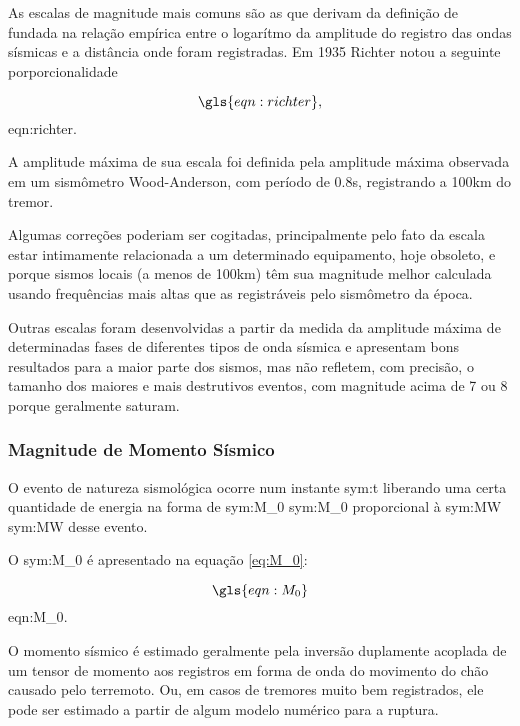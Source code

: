 As escalas de magnitude mais comuns são as que derivam da definição de \citet{richter_1935}
fundada na relação empírica entre o logarítmo da amplitude do registro das ondas sísmicas e a distância onde foram
registradas. Em 1935 Richter notou a seguinte porporcionalidade

\begin{equation}
	\gls{eqn:richter},
	\label{eq:richter}
\end{equation}
\glsdesc*{eqn:richter}.


A amplitude máxima de sua
escala foi definida pela amplitude máxima observada em um sismômetro Wood-Anderson, com período de 0.8s, registrando a 100km 
do tremor.

Algumas correções poderiam ser cogitadas, principalmente pelo fato da escala estar intimamente 
relacionada a um determinado equipamento, hoje obsoleto, e porque sismos locais (a menos de 100km) têm sua magnitude
melhor calculada usando frequências mais altas que as registráveis pelo sismômetro da época.


Outras escalas foram desenvolvidas a partir da medida da amplitude máxima de determinadas fases 
de diferentes tipos de onda sísmica e apresentam bons resultados para a maior parte dos sismos, 
mas não refletem, com precisão, 
o tamanho dos maiores e mais destrutivos eventos, com magnitude acima de 7 ou 8 porque geralmente saturam.


\subsubsection{Magnitude de Momento Sísmico }
\label{sec:risco_sismico}

O evento de natureza sismológica ocorre num
instante \gls{sym:t} liberando uma certa quantidade de energia na forma de \glsdesc{sym:M_0}
\gls{sym:M_0} proporcional à \glsdesc{sym:MW} \gls{sym:MW} desse evento.

O \glsdesc{sym:M_0} é apresentado na equação \eqref{eq:M_0}:

\begin{equation}
	\gls{eqn:M_0}
	\label{eq:M_0}
\end{equation}
\glsdesc*{eqn:M_0}.

O momento sísmico é estimado geralmente pela inversão duplamente acoplada de um tensor de momento aos registros em 
forma de onda do movimento do chão causado pelo terremoto. Ou, em casos de tremores muito bem registrados, ele pode
ser estimado a partir de algum modelo numérico para a ruptura.

